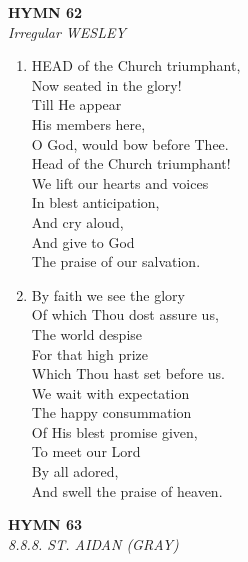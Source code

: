 \newpage
\begin{center}
    {\Large \textbf{HYMN 62}}
    \\
    \textit{Irregular WESLEY}
\end{center}
\vspace{1em}

\begin{enumerate}
    \item HEAD of the Church triumphant, \\
        Now seated in the glory! \\
        Till He appear \\
        His members here, \\
        O God, would bow before Thee. \\
        Head of the Church triumphant! \\
        We lift our hearts and voices \\
        In blest anticipation, \\
        And cry aloud, \\
        And give to God \\
        The praise of our salvation.

    \item By faith we see the glory \\
        Of which Thou dost assure us, \\
        The world despise \\
        For that high prize \\
        Which Thou hast set before us. \\
        We wait with expectation \\
        The happy consummation \\
        Of His blest promise given, \\
        To meet our Lord \\
        By all adored, \\
        And swell the praise of heaven.

\end{enumerate}

\newpage
\begin{center}
    {\Large \textbf{HYMN 63}}
    \\
    \textit{8.8.8. ST. AIDAN (GRAY)}
\end{center}
\vspace{1em}

